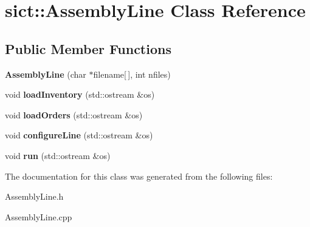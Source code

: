 \hypertarget{classsict_1_1AssemblyLine}{}\section{sict\+::Assembly\+Line Class Reference}
\label{classsict_1_1AssemblyLine}
\subsection*{Public Member Functions}
\begin{DoxyCompactItemize}
\item 
\mbox{\label{classsict_1_1AssemblyLine_a4474cdbd038302bff4c2156378885b1e}} 
{\bfseries Assembly\+Line} (char $\ast$filename\mbox{[}$\,$\mbox{]}, int nfiles)
\item 
\mbox{\label{classsict_1_1AssemblyLine_a6262c74cb2d0a5c47cec2552596d8682}} 
void {\bfseries load\+Inventory} (std\+::ostream \&os)
\item 
\mbox{\label{classsict_1_1AssemblyLine_aa8f4560c9a29e2a623d2f5c661b26c94}} 
void {\bfseries load\+Orders} (std\+::ostream \&os)
\item 
\mbox{\label{classsict_1_1AssemblyLine_aa5df8cd3a319d7d1cb81ced7982d406f}} 
void {\bfseries configure\+Line} (std\+::ostream \&os)
\item 
\mbox{\label{classsict_1_1AssemblyLine_a4aa829576688cb8713ad66c1e2075cd9}} 
void {\bfseries run} (std\+::ostream \&os)
\end{DoxyCompactItemize}


The documentation for this class was generated from the following files\+:\begin{DoxyCompactItemize}
\item 
Assembly\+Line.\+h\item 
Assembly\+Line.\+cpp\end{DoxyCompactItemize}
